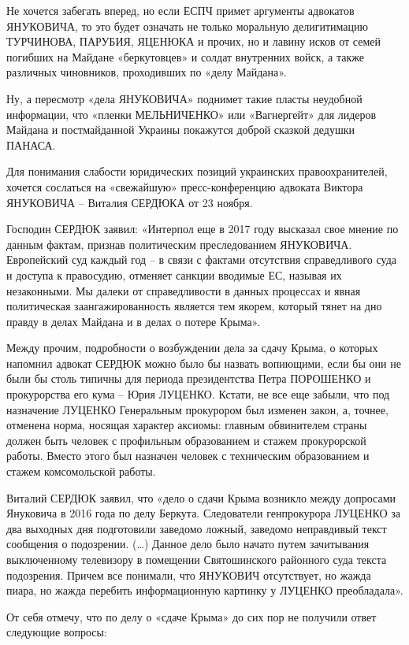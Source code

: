 Не хочется забегать вперед, но если ЕСПЧ примет аргументы адвокатов ЯНУКОВИЧА,
то это будет означать не только моральную делигитимацию ТУРЧИНОВА, ПАРУБИЯ,
ЯЦЕНЮКА и прочих, но и лавину исков от семей погибших на Майдане «беркутовцев»
и солдат внутренних войск, а также различных чиновников, проходивших по «делу
Майдана». 

Ну, а пересмотр «дела ЯНУКОВИЧА» поднимет такие пласты неудобной информации,
что «пленки МЕЛЬНИЧЕНКО» или «Вагнергейт» для лидеров Майдана и постмайданной
Украины покажутся доброй сказкой дедушки ПАНАСА.  

Для понимания слабости юридических позиций украинских правоохранителей, хочется
сослаться на «свежайшую» пресс-конференцию адвоката Виктора ЯНУКОВИЧА – Виталия
СЕРДЮКА от 23 ноября.    

Господин СЕРДЮК заявил: «Интерпол еще в 2017 году высказал свое мнение по
данным фактам, признав политическим преследованием ЯНУКОВИЧА. Европейский суд
каждый год – в связи с фактами отсутствия справедливого суда и доступа к
правосудию, отменяет санкции вводимые ЕС, называя их незаконными. Мы далеки от
справедливости в данных процессах и явная политическая заангажированность
является тем якорем, который тянет на дно правду в делах Майдана и в делах о
потере Крыма».

Между прочим, подробности о возбуждении дела за сдачу Крыма, о которых напомнил
адвокат СЕРДЮК можно было бы назвать вопиющими, если бы они не были бы столь
типичны для периода президентства Петра ПОРОШЕНКО и прокурорства его кума –
Юрия ЛУЦЕНКО. Кстати, не все еще забыли, что под назначение ЛУЦЕНКО Генеральным
прокурором был изменен закон, а, точнее, отменена норма, носящая характер
аксиомы: главным обвинителем страны должен быть человек с профильным
образованием и стажем прокурорской работы. Вместо этого был назначен человек с
техническим образованием и стажем комсомольской работы. 

Виталий СЕРДЮК заявил, что «дело о сдачи Крыма возникло между допросами
Януковича в 2016 года по делу Беркута. Следователи генпрокурора ЛУЦЕНКО за два
выходных дня подготовили заведомо ложный, заведомо неправдивый текст сообщения
о подозрении. (…) Данное дело было начато путем зачитывания выключенному
телевизору в помещении Святошинского районного суда текста подозрения. Причем
все понимали, что ЯНУКОВИЧ отсутствует, но жажда пиара, но жажда перебить
информационную картинку у ЛУЦЕНКО преобладала».

От себя отмечу, что по делу о «сдаче Крыма» до сих пор не получили ответ
следующие вопросы:    

